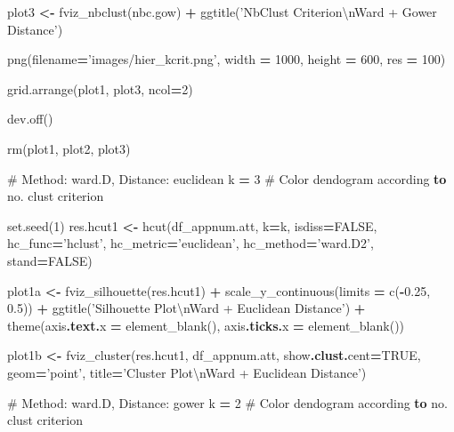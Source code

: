 \documentclass[]{article}
\newenvironment{Shaded}{\begin{snugshade}}{\end{snugshade}}
\newcommand{\KeywordTok}[1]{\textcolor[rgb]{0.13,0.29,0.53}{\textbf{{#1}}}}
\newcommand{\DecValTok}[1]{\textcolor[rgb]{0.00,0.00,0.81}{{#1}}}
\newcommand{\FloatTok}[1]{\textcolor[rgb]{0.00,0.00,0.81}{{#1}}}
\newcommand{\StringTok}[1]{\textcolor[rgb]{0.31,0.60,0.02}{{#1}}}
\newcommand{\OtherTok}[1]{\textcolor[rgb]{0.56,0.35,0.01}{{#1}}}
\newcommand{\NormalTok}[1]{{#1}}
\begin{document}
\begin{Shaded}
\begin{Highlighting}[]
\NormalTok{plot3 }\KeywordTok{<-} \NormalTok{fviz_nbclust(nbc.gow) }\KeywordTok{+} 
  \NormalTok{ggtitle(}\StringTok{'NbClust Criterion\textbackslash{}nWard + Gower Distance'}\NormalTok{)}


\NormalTok{png(filename}\KeywordTok{=}\StringTok{'images/hier_kcrit.png'}\NormalTok{, }
    \NormalTok{width }\KeywordTok{=} \DecValTok{1000}\NormalTok{, height }\KeywordTok{=} \DecValTok{600}\NormalTok{, res }\KeywordTok{=} \DecValTok{100}\NormalTok{)}

\NormalTok{grid.arrange(plot1, plot3, ncol}\KeywordTok{=}\DecValTok{2}\NormalTok{)}

\NormalTok{dev.off()}

\NormalTok{rm(plot1, plot2, plot3)}

\OtherTok{# Method: ward.D, Distance: euclidean}
\NormalTok{k }\KeywordTok{=} \DecValTok{3} \NormalTok{# Color dendogram according }\KeywordTok{to} \NormalTok{no. clust criterion}

\NormalTok{set.seed(}\DecValTok{1}\NormalTok{)}
\NormalTok{res.hcut1 }\KeywordTok{<-} \NormalTok{hcut(df_appnum.att, k}\KeywordTok{=}\NormalTok{k, isdiss}\KeywordTok{=}\NormalTok{FALSE, }
                  \NormalTok{hc_func}\KeywordTok{=}\StringTok{'hclust'}\NormalTok{, hc_metric}\KeywordTok{=}\StringTok{'euclidean'}\NormalTok{,}
                  \NormalTok{hc_method}\KeywordTok{=}\StringTok{'ward.D2'}\NormalTok{, stand}\KeywordTok{=}\NormalTok{FALSE)}

\NormalTok{plot1a }\KeywordTok{<-} \NormalTok{fviz_silhouette(res.hcut1) }\KeywordTok{+}
  \NormalTok{scale_y_continuous(limits }\KeywordTok{=} \NormalTok{c(}\KeywordTok{-}\FloatTok{0.25}\NormalTok{, }\FloatTok{0.5}\NormalTok{)) }\KeywordTok{+}
  \NormalTok{ggtitle(}\StringTok{'Silhouette Plot\textbackslash{}nWard + Euclidean Distance'}\NormalTok{) }\KeywordTok{+}
  \NormalTok{theme(axis}\KeywordTok{.text.}\NormalTok{x }\KeywordTok{=} \NormalTok{element_blank(), axis}\KeywordTok{.ticks.}\NormalTok{x }\KeywordTok{=} \NormalTok{element_blank())}

\NormalTok{plot1b }\KeywordTok{<-} \NormalTok{fviz_cluster(res.hcut1, df_appnum.att, }
                      \NormalTok{show}\KeywordTok{.clust.}\NormalTok{cent}\KeywordTok{=}\NormalTok{TRUE, geom}\KeywordTok{=}\StringTok{'point'}\NormalTok{,}
                      \NormalTok{title}\KeywordTok{=}\StringTok{'Cluster Plot\textbackslash{}nWard + Euclidean Distance'}\NormalTok{)}


\OtherTok{# Method: ward.D, Distance: gower}
\NormalTok{k }\KeywordTok{=} \DecValTok{2} \NormalTok{# Color dendogram according }\KeywordTok{to} \NormalTok{no. clust criterion}


\end{Highlighting}
\end{Shaded}
\end{document}
